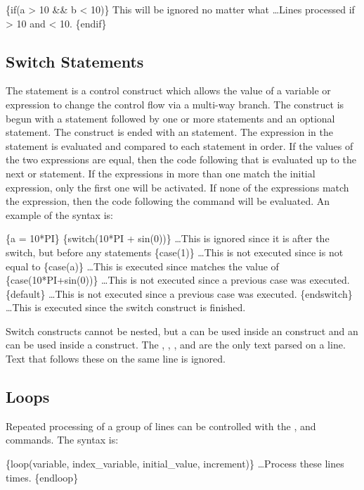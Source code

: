 \begin{apinp}
\{if(a > 10 && b < 10)\} This will be ignored no matter what
\ldots Lines processed if  > 10 and  < 10.
\{endif\}
\end{apinp}

\subsection{Switch Statements}
The  statement is a control construct which allows the value of a variable or expression to change the control flow via a multi-way branch.
The construct is begun with a  statement followed by one or more  statements and an optional  statement. The construct is ended with an  statement.  The expression in the  statement is evaluated and compared to each  statement in order.  If the values of the two expressions are equal, then the code following that  is evaluated up to the next  or  statement. If the expressions in more than one  match the initial  expression, only the first one will be activated.  If none of the  expressions match the  expression, then the code following the  command will be evaluated. An example of the syntax is:

\begin{apinp}
\{a = 10*PI\}
\{switch(10*PI + sin(0))\}
\ldots This is ignored since it is after the switch, but before any  statements
\{case(1)\}
\ldots This is not executed since  is not equal to 
\{case(a)\}
\ldots This is executed since  matches the value of 
\{case(10*PI+sin(0))\}
\ldots This is not executed since a previous case was executed.
\{default\}
\ldots This is not executed since a previous case was executed.
\{endswitch\}
\ldots This is executed since the switch construct
 is finished.
\end{apinp}

Switch constructs cannot be nested, but a  can be used inside an  construct and an  can be used inside a  construct.
The , , , and  are the only text parsed on a line. Text that follows these on the same line is
ignored.

\subsection{Loops} Repeated processing of a group of lines can be controlled
with the , and  commands. The syntax is:
\begin{apinp}
\{loop(variable, index\_variable, initial\_value, increment)\}
\ldots Process these lines  times.  
\{endloop\}
\end{apinp}

